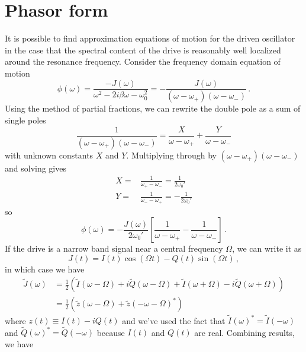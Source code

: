 \documentclass{article}
\begin{document}
\section{Phasor form}

It is possible to find approximation equations of motion for the driven oscillator in the case that the spectral content of the drive is reasonably well localized around the resonance frequency.
Consider the frequency domain equation of motion
\begin{equation}
  \phi(\omega) = \frac{-J(\omega)}{\omega^2 - 2 i \beta \omega - \omega_0^2}
  = - \frac{J(\omega)}{(\omega - \omega_+)(\omega - \omega_-)} \, .
\end{equation}
Using the method of partial fractions, we can rewrite the double pole as a sum of single poles
\begin{equation}
  \frac{1}{(\omega - \omega_+)(\omega - \omega_-)}
  = \frac{X}{\omega - \omega_+} + \frac{Y}{\omega - \omega_-}
\end{equation}
with unknown constants $X$ and $Y$.
Multiplying through by $(\omega - \omega_+)(\omega - \omega_-)$ and solving gives
\begin{align*}
  X =& \frac{1}{\omega_+ - \omega_-} =   \frac{1}{2 \omega_0'} \\
  Y =& \frac{1}{\omega_- - \omega_+} = - \frac{1}{2 \omega_0'}
\end{align*}
so
\begin{equation}
  \phi(\omega) = - \frac{J(\omega)}{2 \omega_0'}
  \left[ \frac{1}{\omega - \omega_+} - \frac{1}{\omega - \omega_-} \right] \, .
\end{equation}
If the drive is a narrow band signal near a central frequency $\Omega$, we can write it as
\begin{equation}
  J(t) = I(t) \cos(\Omega t) - Q(t) \sin(\Omega t) \, ,
\end{equation}
in which case we have
\begin{align*}
  \tilde{J}(\omega)
  &= \frac{1}{2} \left(
      \tilde{I}(\omega - \Omega) + i \tilde{Q}(\omega - \Omega)
    + \tilde{I}(\omega + \Omega) - i \tilde{Q}(\omega + \Omega)
  \right) \\
  &= \frac{1}{2} \left(
      \tilde{z}(\omega - \Omega) + \tilde{z}(-\omega - \Omega)^*
  \right)
\end{align*}
where $z(t) \equiv I(t) - i Q(t)$ and we've used the fact that $\tilde{I}(\omega)^* = \tilde{I}(-\omega)$ and $\tilde{Q}(\omega)^* = \tilde{Q}(-\omega)$ because $I(t)$ and $Q(t)$ are real.
Combining results, we have
\end{document}
